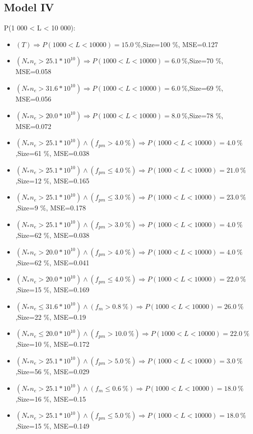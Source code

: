 \documentclass[numbered]{CSL}
\begin{document}
\subsection{Model IV}
P(1 000 < L < 10 000):
\begin{itemize}
\item $(T) \Rightarrow P(1 000 < L < 10 000) = 15.0~\%$,\hfill Size=100 \%, MSE=0.127
\item $(N_* n_e > 25.1 * 10^{10}) \Rightarrow P(1 000 < L < 10 000) = 6.0~\%$,\hfill Size=70 \%, MSE=0.058
\item $(N_* n_e > 31.6 * 10^{10}) \Rightarrow P(1 000 < L < 10 000) = 6.0~\%$,\hfill Size=69 \%, MSE=0.056
\item $(N_* n_e > 20.0 * 10^{10}) \Rightarrow P(1 000 < L < 10 000) = 8.0~\%$,\hfill Size=78 \%, MSE=0.072
\item $(N_* n_e > 25.1 * 10^{10}) \land (f_{pm} > 4.0~\%) \Rightarrow P(1 000 < L < 10 000) = 4.0~\%$,\hfill Size=61 \%, MSE=0.038
\item $(N_* n_e > 25.1 * 10^{10}) \land (f_{pm} \leq 4.0~\%) \Rightarrow P(1 000 < L < 10 000) = 21.0~\%$,\hfill Size=12 \%, MSE=0.165
\item $(N_* n_e > 25.1 * 10^{10}) \land (f_{pm} \leq 3.0~\%) \Rightarrow P(1 000 < L < 10 000) = 23.0~\%$,\hfill Size=9 \%, MSE=0.178
\item $(N_* n_e > 25.1 * 10^{10}) \land (f_{pm} > 3.0~\%) \Rightarrow P(1 000 < L < 10 000) = 4.0~\%$,\hfill Size=62 \%, MSE=0.038
\item $(N_* n_e > 20.0 * 10^{10}) \land (f_{pm} > 4.0~\%) \Rightarrow P(1 000 < L < 10 000) = 4.0~\%$,\hfill Size=62 \%, MSE=0.041
\item $(N_* n_e > 20.0 * 10^{10}) \land (f_{pm} \leq 4.0~\%) \Rightarrow P(1 000 < L < 10 000) = 22.0~\%$,\hfill Size=15 \%, MSE=0.169
\item $(N_* n_e \leq 31.6 * 10^{10}) \land (f_m > 0.8~\%) \Rightarrow P(1 000 < L < 10 000) = 26.0~\%$,\hfill Size=22 \%, MSE=0.19
\item $(N_* n_e \leq 20.0 * 10^{10}) \land (f_{pm} > 10.0~\%) \Rightarrow P(1 000 < L < 10 000) = 22.0~\%$,\hfill Size=10 \%, MSE=0.172
\item $(N_* n_e > 25.1 * 10^{10}) \land (f_{pm} > 5.0~\%) \Rightarrow P(1 000 < L < 10 000) = 3.0~\%$,\hfill Size=56 \%, MSE=0.029
\item $(N_* n_e > 25.1 * 10^{10}) \land (f_m \leq 0.6~\%) \Rightarrow P(1 000 < L < 10 000) = 18.0~\%$,\hfill Size=16 \%, MSE=0.15
\item $(N_* n_e > 25.1 * 10^{10}) \land (f_{pm} \leq 5.0~\%) \Rightarrow P(1 000 < L < 10 000) = 18.0~\%$,\hfill Size=15 \%, MSE=0.149

\end{itemize}
\end{document}
